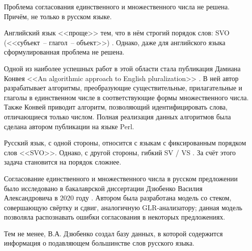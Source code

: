 \documentclass[main]{subfiles}
\begin{document}
Проблема согласования единственного и множественного числа не решена. Причём, не только в русском языке.

Английский язык <<проще>> тем, что в нём строгий порядок слов: SVO (<<субъект~-- глагол~-- объект>>) \cite{synt}. Однако, даже для английского языка сформулированная проблема не решена. 

Одной из наиболее успешных работ в этой области стала публикация Дамиана Конвея <<An algorithmic approach to English pluralization>> \cite{plur}. В ней автор разрабатывает алгоритмы, преобразующие существительные, прилагательные и глаголы в единственном числе в соответствующие формы множественного числа. Также Конвей приводит алгоритм, позволяющий идентифицировать слова, отличающиеся только числом. Полная реализация данных алгоритмов была сделана автором публикации на языке Perl.

Русский язык, с одной стороны, относится с языкам с фиксированным порядком слов <<SVO>>. Однако, с другой стороны, гибкий SV / VS \cite{ox}. За счёт этого задача становится на порядок сложнее. 

Согласование единственного и множественного числа в русском предложении было исследовано в бакалаврской диссертации Дзюбенко Василия Александровича в $2020$ году \cite{dz}. Автором была разработана модель со стеком, совершающую свёртку и сдвиг, аналогичную GLR-анализатору; данная модель позволяла распознавать ошибки согласования в некоторых предложениях.

Тем не менее, В.А. Дзюбенко создал базу данных, в которой содержится информация о подавляющем большинстве слов русского языка. 
\end{document}
